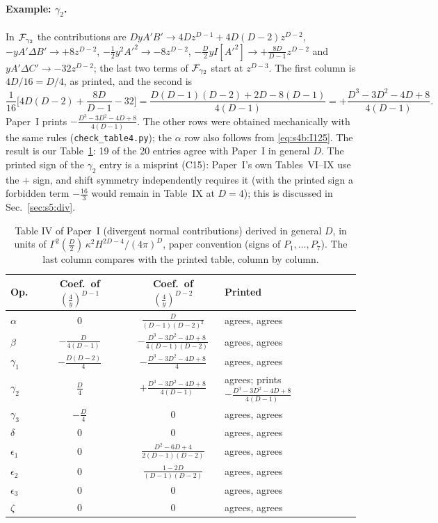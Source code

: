 \documentclass[aps,prd,onecolumn,10pt,nofootinbib,floatfix]{revtex4-2}
\newcommand{\PI}{Paper~I}
\begin{document}
\paragraph*{Example: $\gamma_2$.}
In $\mathcal{F}_{\gamma_2}$ the contributions are $DyA'B'\to4Dz^{D-1}+4D(D-2)z^{D-2}$, $-yA'\Delta B'\to+8z^{D-2}$,
$-\frac12y^2A'^2\to-8z^{D-2}$, $-\frac D2yI[A'^2]\to+\frac{8D}{D-1}z^{D-2}$ and $yA'\Delta C'\to-32z^{D-2}$; the last two
terms of $\mathcal{F}_{\gamma_2}$ start at $z^{D-3}$. The first column is $4D/16=D/4$, as printed, and the second is
\begin{equation}
\frac1{16}\Big[4D(D-2)+\frac{8D}{D-1}-32\Big]=\frac{D(D-1)(D-2)+2D-8(D-1)}{4(D-1)}=+\frac{D^3-3D^2-4D+8}{4(D-1)} .
\label{eq:s4b:gamma2}
\end{equation}
\PI{} prints $-\frac{D^3-3D^2-4D+8}{4(D-1)}$. The other rows were obtained mechanically with the same rules
(\texttt{check\_table4.py}); the $\alpha$ row also follows from \eqref{eq:s4b:I125}. The result is
our Table~\ref{tab:s4b:IV}: 19 of the 20 entries agree with \PI{} in general $D$. The printed sign of the $\gamma_2$
entry is a misprint (C15): \PI's own Tables~VI--IX use the $+$ sign, and shift symmetry independently requires it (with
the printed sign a forbidden term $-\frac{16}{3}$ would remain in Table~IX at $D=4$); this is discussed in
Sec.~\ref{sec:s5:div}.

\begin{table}[tb]
\caption{Table IV of \PI{} (divergent normal contributions) derived in general $D$, in units of
$\Gamma^2(\frac D2)\,\kappa^2H^{2D-4}/(4\pi)^D$, paper convention (signs of $P_1,\dots,P_7$). The last column compares
with the printed table, column by column.}
\label{tab:s4b:IV}
\renewcommand{\arraystretch}{1.45}
\begin{ruledtabular}
\begin{tabular}{@{}lccl@{}}
Op. & Coef.\ of $(\frac4y)^{D-1}$ & Coef.\ of $(\frac4y)^{D-2}$ & Printed\\
\hline
$\alpha$ & $0$ & $\frac{D}{(D-1)(D-2)^2}$ & agrees, agrees\\
$\beta$ & $-\frac{D}{4(D-1)}$ & $-\frac{D^3-3D^2-4D+8}{4(D-1)(D-2)}$ & agrees, agrees\\
$\gamma_1$ & $-\frac{D(D-2)}{4}$ & $-\frac{D^3-3D^2-4D+8}{4}$ & agrees, agrees\\
$\gamma_2$ & $\frac D4$ & $+\frac{D^3-3D^2-4D+8}{4(D-1)}$ & agrees; prints $-\frac{D^3-3D^2-4D+8}{4(D-1)}$\\
$\gamma_3$ & $-\frac D4$ & $0$ & agrees, agrees\\
$\delta$ & $0$ & $0$ & agrees, agrees\\
$\epsilon_1$ & $0$ & $\frac{D^2-6D+4}{2(D-1)(D-2)}$ & agrees, agrees\\
$\epsilon_2$ & $0$ & $\frac{1-2D}{(D-1)(D-2)}$ & agrees, agrees\\
$\epsilon_3$ & $0$ & $0$ & agrees, agrees\\
$\zeta$ & $0$ & $0$ & agrees, agrees\\
\end{tabular}
\end{ruledtabular}
\end{table}
\end{document}

